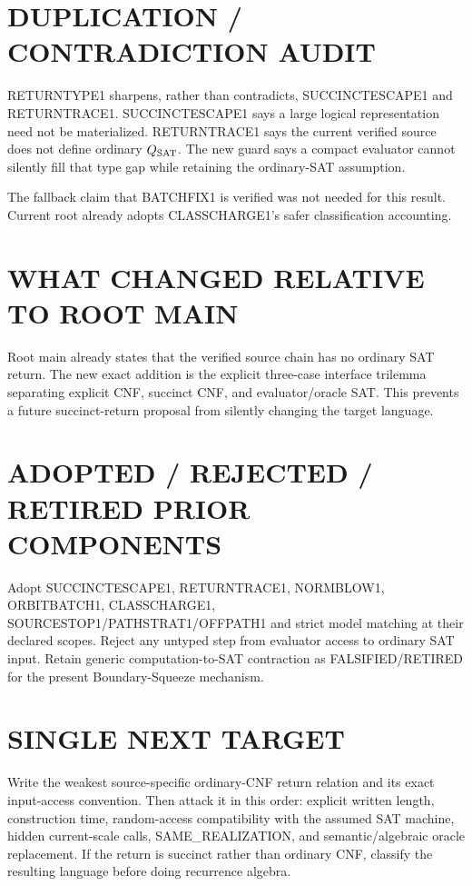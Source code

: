 \documentclass[11pt]{article}
\begin{document}
\section*{DUPLICATION / CONTRADICTION AUDIT}
RETURNTYPE1 sharpens, rather than contradicts, SUCCINCTESCAPE1 and RETURNTRACE1. SUCCINCTESCAPE1 says a large logical representation need not be materialized. RETURNTRACE1 says the current verified source does not define ordinary $Q_{\rm SAT}$. The new guard says a compact evaluator cannot silently fill that type gap while retaining the ordinary-SAT assumption.

The fallback claim that BATCHFIX1 is verified was not needed for this result. Current root already adopts CLASSCHARGE1's safer classification accounting.

\section*{WHAT CHANGED RELATIVE TO ROOT MAIN}
Root main already states that the verified source chain has no ordinary SAT return. The new exact addition is the explicit three-case interface trilemma separating explicit CNF, succinct CNF, and evaluator/oracle SAT. This prevents a future succinct-return proposal from silently changing the target language.

\section*{ADOPTED / REJECTED / RETIRED PRIOR COMPONENTS}
Adopt SUCCINCTESCAPE1, RETURNTRACE1, NORMBLOW1, ORBITBATCH1, CLASSCHARGE1, SOURCESTOP1/PATHSTRAT1/OFFPATH1 and strict model matching at their declared scopes. Reject any untyped step from evaluator access to ordinary SAT input. Retain generic computation-to-SAT contraction as FALSIFIED/RETIRED for the present Boundary-Squeeze mechanism.

\section*{SINGLE NEXT TARGET}
Write the weakest source-specific ordinary-CNF return relation and its exact input-access convention. Then attack it in this order: explicit written length, construction time, random-access compatibility with the assumed SAT machine, hidden current-scale calls, SAME_REALIZATION, and semantic/algebraic oracle replacement. If the return is succinct rather than ordinary CNF, classify the resulting language before doing recurrence algebra.
\end{document}
